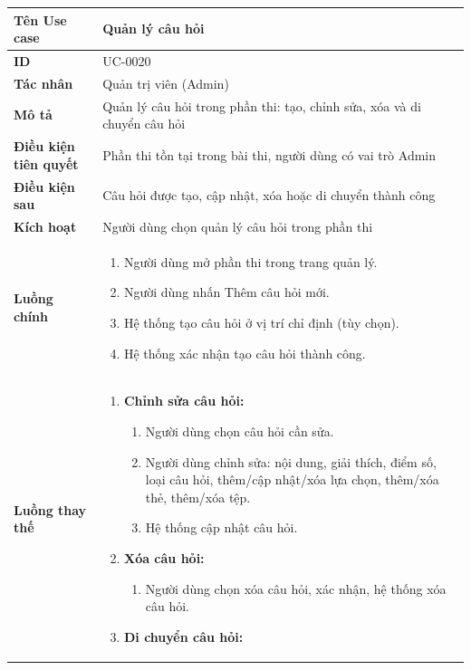 {
\small
\renewcommand{\arraystretch}{1.15}

\begin{tabularx}{\textwidth}{|>{\raggedright\arraybackslash}p{3.5cm}|>{\raggedright\arraybackslash}X|}
\hline
\textbf{Tên Use case} & Quản lý câu hỏi \\
\hline
\textbf{ID} & UC-0020 \\
\hline
\textbf{Tác nhân} & Quản trị viên (Admin) \\
\hline
\textbf{Mô tả} & Quản lý câu hỏi trong phần thi: tạo, chỉnh sửa, xóa và di chuyển câu hỏi \\
\hline
\textbf{Điều kiện tiên quyết} & Phần thi tồn tại trong bài thi, người dùng có vai trò Admin \\
\hline
\textbf{Điều kiện sau} & Câu hỏi được tạo, cập nhật, xóa hoặc di chuyển thành công \\
\hline
\textbf{Kích hoạt} & Người dùng chọn quản lý câu hỏi trong phần thi \\
\hline
\textbf{Luồng chính} &
\begin{enumerate}
    \item Người dùng mở phần thi trong trang quản lý.
    \item Người dùng nhấn Thêm câu hỏi mới.
    \item Hệ thống tạo câu hỏi ở vị trí chỉ định (tùy chọn).
    \item Hệ thống xác nhận tạo câu hỏi thành công.
\end{enumerate} \\
\hline
\textbf{Luồng thay thế} &
\begin{enumerate}
    \item \textbf{Chỉnh sửa câu hỏi:}
    \begin{enumerate}
        \item[2A.] Người dùng chọn câu hỏi cần sửa.
        \item[3A.] Người dùng chỉnh sửa: nội dung, giải thích, điểm số, loại câu hỏi, thêm/cập nhật/xóa lựa chọn, thêm/xóa thẻ, thêm/xóa tệp.
        \item[4A.] Hệ thống cập nhật câu hỏi.
    \end{enumerate}
    \item \textbf{Xóa câu hỏi:}
    \begin{enumerate}
        \item[2B.] Người dùng chọn xóa câu hỏi, xác nhận, hệ thống xóa câu hỏi.
    \end{enumerate}
    \item \textbf{Di chuyển câu hỏi:}

\end{enumerate}
\end{tabularx}}

